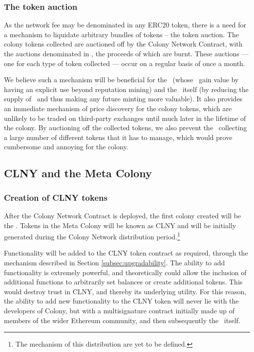 \subsubsection{The token auction}

As the network fee may be denominated in any ERC20 token, there is a need for a mechanism to liquidate arbitrary bundles of tokens -- the token auction. The colony tokens collected are auctioned off by the Colony Network Contract, with the auctions denominated in \rcts, the proceeds of which are burnt. These auctions --- one for each type of token collected --- occur on a regular basis of once a month.

We believe such a mechanism will be beneficial for the \rcths\ (whose \rcts\ gain value by having an explicit use beyond reputation mining) and the \rc\ itself (by reducing the supply of \rcts\ and thus making any future minting more valuable). It also provides an immediate mechanism of price discovery for the colony tokens, which are unlikely to be traded on third-party exchanges until much later in the lifetime of the colony. By auctioning off the collected tokens, we also prevent the \rc\ collecting a large number of different tokens that it has to manage, which would prove cumbersome and annoying for the colony.

\subsection{CLNY and the Meta Colony}\label{sec:clny}

\subsubsection{Creation of CLNY tokens}

After the Colony Network Contract is deployed, the first colony created will be the \rc. Tokens in the Meta Colony will be known as CLNY and will be initially generated during the Colony Network distribution period.\footnote{The mechanism of this distribution are yet to be defined.}

Functionality will be added to the CLNY token contract as required, through the  mechanism described in Section  \ref{subsec:upgradability}. The ability to add functionality is extremely powerful, and theoretically could allow the inclusion of additional functions to arbitrarily set balances or create additional tokens. This would destroy trust in CLNY, and thereby its underlying utility. For this reason, the ability to add new functionality to the CLNY token will never lie with the developers of Colony, but with a multisignature contract initially made up of members of the wider Ethereum community, and then subsequently the \rc\ itself.

